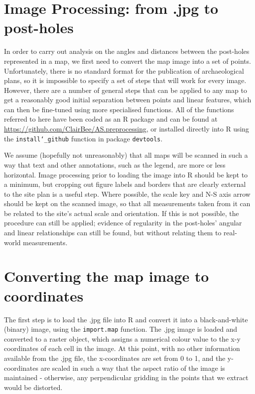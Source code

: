 \documentclass[10pt,fleqn]{article}
\begin{document}
\section*{Image Processing: from .jpg to post-holes}

In order to carry out analysis on the angles and distances between the post-holes represented in a map, we first need to convert the map image into a set of points. Unfortunately, there is no standard format for the publication of archaeological plans, so it is impossible to specify a set of steps that will work for every image. However, there are a number of general steps that can be applied to any map to get a reasonably good initial separation between points and linear features, which can then be fine-tuned using more specialised functions. All of the functions referred to here have been coded as an R package and can be found at \url{https://github.com/ClairBee/AS.preprocessing}, or installed directly into R using the \texttt{install\char`_github} function in package \texttt{devtools}.

We assume (hopefully not unreasonably) that all maps will be scanned in such a way that text and other annotations, such as the legend, are more or less horizontal. Image processing prior to loading the image into R should be kept to a minimum, but cropping out figure labels and borders that are clearly external to the site plan is a useful step. Where possible, the scale key and N-S axis arrow should be kept on the scanned image, so that all measurements taken from it can be related to the site's actual scale and orientation. If this is not possible, the procedure can still be applied; evidence of regularity in the post-holes' angular and linear relationships can still be found, but without relating them to real-world measurements.

\section{Converting the map image to coordinates}

The first step is to load the .jpg file into R and convert it into a black-and-white (binary) image, using the \texttt{import.map} function. The .jpg image is loaded and converted to a raster object, which assigns a numerical colour value to the x-y coordinates of each cell in the image. At this point, with no other information available from the .jpg file, the x-coordinates are set from 0 to 1, and the y-coordinates are scaled in such a way that the aspect ratio of the image is maintained - otherwise, any perpendicular gridding in the points that we extract would be distorted. 
\end{document}
